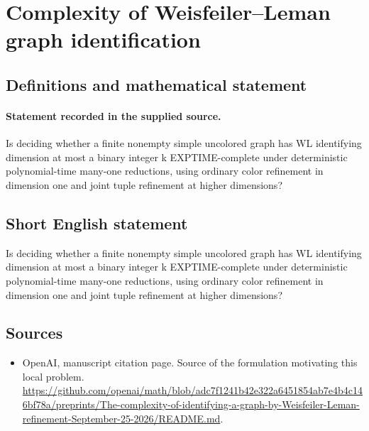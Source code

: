 \documentclass[11pt]{article}
\begin{document}
\section*{Complexity of Weisfeiler–Leman graph identification}\label{30007497}
\subsection{Definitions and mathematical statement}
\paragraph{Statement recorded in the supplied source.}
Is deciding whether a finite nonempty simple uncolored graph has WL identifying dimension at most a binary integer k EXPTIME-complete under deterministic polynomial-time many-one reductions, using ordinary color refinement in dimension one and joint tuple refinement at higher dimensions?
\subsection{Short English statement}
Is deciding whether a finite nonempty simple uncolored graph has WL identifying dimension at most a binary integer k EXPTIME-complete under deterministic polynomial-time many-one reductions, using ordinary color refinement in dimension one and joint tuple refinement at higher dimensions?
\subsection{Sources}
\begin{itemize}
\item[S1] OpenAI, manuscript citation page. Source of the formulation motivating this local problem.
\url{https://github.com/openai/math/blob/adc7f1241b42e322a6451854ab7e4b4c146bf78a/preprints/The-complexity-of-identifying-a-graph-by-Weisfeiler-Leman-refinement-September-25-2026/README.md}.
\end{itemize}
\end{document}
